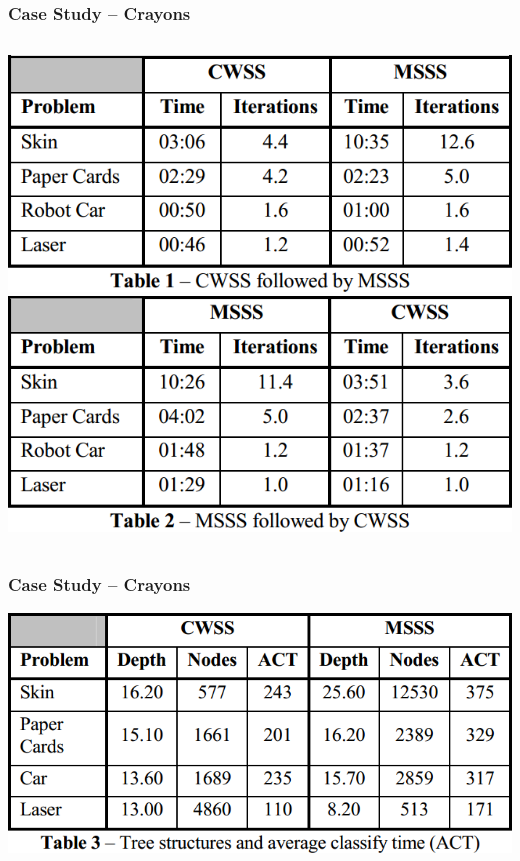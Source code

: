 \documentclass[xcolor=svgnames]{beamer}
\begin{document}
\begin{frame}
	\frametitle{Case Study -- Crayons}
	\begin{columns}
		\includegraphics[width=\textwidth]{img/crayons-cwss-msss.png}
		\includegraphics[width=\textwidth]{img/crayons-msss-cwss.png}
	\end{columns}
\end{frame}
\begin{frame}
	\frametitle{Case Study -- Crayons}
	\begin{center}
		\includegraphics[width=\textwidth]{img/crayons-results.png}
	\end{center}
\end{frame}
\end{document}

